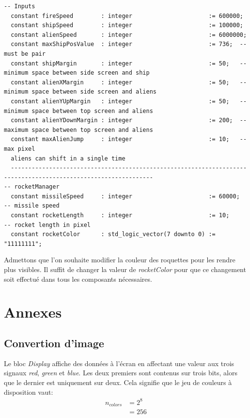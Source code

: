 \documentclass[french]{nakrule}
\begin{document}
\begin{lstlisting}[style=vhdl, caption=Signaux utilisés par \emph{Input} \& \emph{rocketManager}]
-- Inputs
  constant fireSpeed        : integer                      := 600000;
  constant shipSpeed        : integer                      := 100000;
  constant alienSpeed       : integer                      := 6000000;
  constant maxShipPosValue  : integer                      := 736;  -- must be pair
  constant shipMargin       : integer                      := 50;   -- minimum space between side screen and ship
  constant alienXMargin     : integer                      := 50;   -- minimum space between side screen and aliens
  constant alienYUpMargin   : integer                      := 50;   -- minimum space between top screen and aliens
  constant alienYDownMargin : integer                      := 200;  -- maximum space between top screen and aliens
  constant maxAlienJump     : integer                      := 10;   -- max pixel
  aliens can shift in a single time
  ---------------------------------------------------------------------------------------------------------------
-- rocketManager
  constant missileSpeed     : integer                      := 60000;  -- missile speed
  constant rocketLength     : integer                      := 10;     -- rocket length in pixel
  constant rocketColor      : std_logic_vector(7 downto 0) := "11111111";
\end{lstlisting}

Admettons que l'on souhaite modifier la couleur des roquettes pour les rendre
plus visibles. Il suffit de changer la valeur de \emph{rocketColor} pour que ce
changement soit effectué dans tous les composants nécessaires. 

\asymmetricalPage
\chapter{Annexes}

\symmetricalPage

\section{Convertion d'image}
\label{sec:convertPicture}

Le bloc \emph{Display} affiche des données à l'écran en affectant une valeur aux
trois signaux \emph{red}, \emph{green} et \emph{blue}. Les deux premiers sont
contenus sur trois bits, alors que le dernier est uniquement sur deux. Cela
signifie que le jeu de couleurs à disposition vaut:
\begin{align*}
  n_{colors} &= 2^{8}\\
             &= 256
\end{align*}
\end{document}
